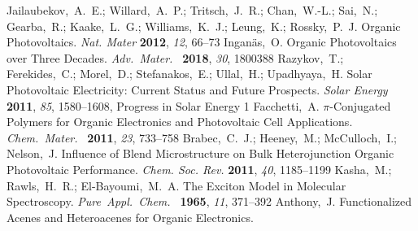 \documentclass[journal=jpclcd,manuscript=letter]{achemso}
\begin{document}
\begin{mcitethebibliography}{51}
Jailaubekov,~A.~E.; Willard,~A.~P.; Tritsch,~J.~R.; Chan,~W.-L.; Sai,~N.;
  Gearba,~R.; Kaake,~L.~G.; Williams,~K.~J.; Leung,~K.; Rossky,~P.~J.
    Organic Photovoltaics. \emph{Nat. Mater} \textbf{2012},
  \emph{12}, 66--73\relax
\mciteBstWouldAddEndPuncttrue
\mciteSetBstMidEndSepPunct{\mcitedefaultmidpunct}
{\mcitedefaultendpunct}{\mcitedefaultseppunct}\relax
\EndOfBibitem
{}
Inganäs,~O. Organic Photovoltaics over Three Decades. \emph{Adv.~Mater.~}
  \textbf{2018}, \emph{30}, 1800388\relax
\mciteBstWouldAddEndPuncttrue
\mciteSetBstMidEndSepPunct{\mcitedefaultmidpunct}
{\mcitedefaultendpunct}{\mcitedefaultseppunct}\relax
\EndOfBibitem
{}
Razykov,~T.; Ferekides,~C.; Morel,~D.; Stefanakos,~E.; Ullal,~H.; Upadhyaya,~H.
  Solar Photovoltaic Electricity: Current Status and Future Prospects.
  \emph{Solar Energy} \textbf{2011}, \emph{85}, 1580--1608, Progress in Solar
  Energy 1\relax
\mciteBstWouldAddEndPuncttrue
\mciteSetBstMidEndSepPunct{\mcitedefaultmidpunct}
{\mcitedefaultendpunct}{\mcitedefaultseppunct}\relax
\EndOfBibitem
{}
Facchetti,~A. $\pi$-Conjugated Polymers for Organic Electronics and
  Photovoltaic Cell Applications. \emph{Chem.~Mater.~} \textbf{2011},
  \emph{23}, 733--758\relax
\mciteBstWouldAddEndPuncttrue
\mciteSetBstMidEndSepPunct{\mcitedefaultmidpunct}
{\mcitedefaultendpunct}{\mcitedefaultseppunct}\relax
\EndOfBibitem
{}
Brabec,~C.~J.; Heeney,~M.; McCulloch,~I.; Nelson,~J. Influence of Blend
  Microstructure on Bulk Heterojunction Organic Photovoltaic Performance.
  \emph{Chem. Soc. Rev.} \textbf{2011}, \emph{40}, 1185--1199\relax
\mciteBstWouldAddEndPuncttrue
\mciteSetBstMidEndSepPunct{\mcitedefaultmidpunct}
{\mcitedefaultendpunct}{\mcitedefaultseppunct}\relax
\EndOfBibitem
{}
Kasha,~M.; Rawls,~H.~R.; El-Bayoumi,~M.~A. The Exciton Model in Molecular
  Spectroscopy. \emph{Pure~Appl.~Chem.~} \textbf{1965}, \emph{11},
  371--392\relax
\mciteBstWouldAddEndPuncttrue
\mciteSetBstMidEndSepPunct{\mcitedefaultmidpunct}
{\mcitedefaultendpunct}{\mcitedefaultseppunct}\relax
\EndOfBibitem
{}
Anthony,~J. Functionalized Acenes and Heteroacenes for Organic Electronics.

\end{mcitethebibliography}
\end{document}
